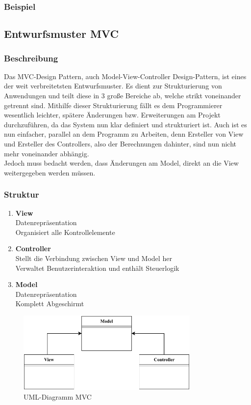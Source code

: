 \subsubsection{Beispiel}
\subsection{Entwurfsmuster MVC}\label{subsec:entwurfsmuster-mvc}
\subsubsection{Beschreibung}
Das MVC-Design Pattern, auch Model-View-Controller Design-Pattern, ist eines der weit verbreitetsten Entwurfsmuster.
Es dient zur Strukturierung von Anwendungen und teilt diese in 3 große Bereiche ab, welche strikt voneinander getrennt sind.
Mithilfe dieser Strukturierung fällt es dem Programmierer wesentlich leichter, spätere Änderungen bzw. Erweiterungen am Projekt durchzuführen, da das System nun klar definiert und strukturiert ist.
Auch ist es nun einfacher, parallel an dem Programm zu Arbeiten, denn Ersteller von View und Ersteller des Controllers, also der Berechnungen dahinter, sind nun nicht mehr voneinander abhängig.\\
Jedoch muss bedacht werden, dass Änderungen am Model, direkt an die View weitergegeben werden müssen.
\subsubsection{Struktur}

\begin{enumerate}
    \item \textbf{View}  \\
    Datenrepräsentation\\
    Organisiert alle Kontrollelemente
    \item \textbf{Controller} \\
    Stellt die Verbindung zwischen View und Model her\\
    Verwaltet Benutzerinteraktion und enthält Steuerlogik
    \item \textbf{Model} \\
    Datenrepräsentation\\
    Komplett Abgeschirmt
\end{enumerate}
\begin{figure}[htb!]
    \centering
    \includegraphics[width=0.8\textwidth]{fig/ainf/ModelViewController.pdf}
    \caption{UML-Diagramm MVC}
    \label{fig:UML-Diagramm MVC}
\end{figure}
